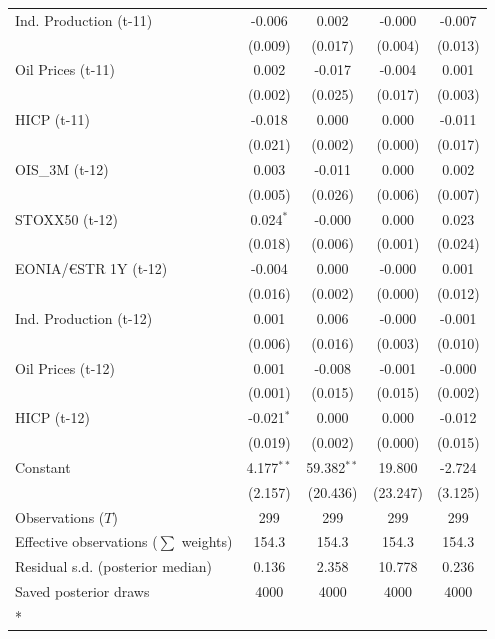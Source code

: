 \begin{longtable}[t]{lcccc}
Ind. Production (t-11) & -0.006 & 0.002 & -0.000 & -0.007\\
 & (0.009) & (0.017) & (0.004) & (0.013)\\
Oil Prices (t-11) & 0.002 & -0.017 & -0.004 & 0.001\\
 & (0.002) & (0.025) & (0.017) & (0.003)\\
HICP (t-11) & -0.018 & 0.000 & 0.000 & -0.011\\
 & (0.021) & (0.002) & (0.000) & (0.017)\\
OIS\_3M (t-12) & 0.003 & -0.011 & 0.000 & 0.002\\
 & (0.005) & (0.026) & (0.006) & (0.007)\\
STOXX50 (t-12) & 0.024$^{*}$ & -0.000 & 0.000 & 0.023\\
 & (0.018) & (0.006) & (0.001) & (0.024)\\
EONIA/€STR 1Y (t-12) & -0.004 & 0.000 & -0.000 & 0.001\\
 & (0.016) & (0.002) & (0.000) & (0.012)\\
Ind. Production (t-12) & 0.001 & 0.006 & -0.000 & -0.001\\
 & (0.006) & (0.016) & (0.003) & (0.010)\\
Oil Prices (t-12) & 0.001 & -0.008 & -0.001 & -0.000\\
 & (0.001) & (0.015) & (0.015) & (0.002)\\
HICP (t-12) & -0.021$^{*}$ & 0.000 & 0.000 & -0.012\\
 & (0.019) & (0.002) & (0.000) & (0.015)\\
Constant & 4.177$^{**}$ & 59.382$^{**}$ & 19.800 & -2.724\\
 & (2.157) & (20.436) & (23.247) & (3.125)\\
\midrule
Observations ($T$) & 299 & 299 & 299 & 299\\
Effective observations ($\sum$ weights) & 154.3 & 154.3 & 154.3 & 154.3\\
Residual s.d. (posterior median) & 0.136 & 2.358 & 10.778 & 0.236\\
Saved posterior draws & 4000 & 4000 & 4000 & 4000\\*
\end{longtable}
\endgroup{}

